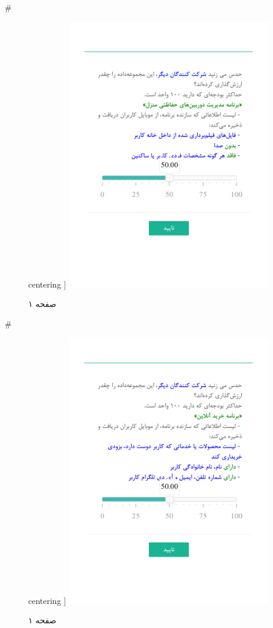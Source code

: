 { 
 # 
\begin{figure}[htpb]
centering ]
\includegraphics[width=0.8\textwidth]{./img/Task61.png/}
\caption{صفحه ۱}
\label{fig:Task1}
\end{figure}
 
 
 # 
\begin{figure}[htpb]
centering ]
\includegraphics[width=0.8\textwidth]{./img/Task62.png/}
\caption{صفحه ۱}
\label{fig:Task1}
\end{figure}
 
}
